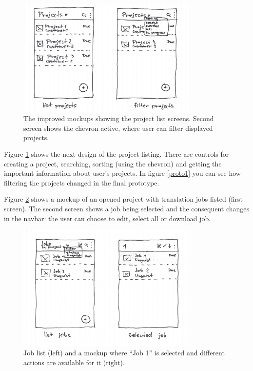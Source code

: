 \begin{figure}[H]
	\includegraphics[width=0.8\textwidth]{pics/projects1}
	\caption{The improved mockups showing the project list screens. Second screen shows the chevron active, where user can filter displayed projects.}
	\label{mock2}
\end{figure}


Figure \ref{mock2} shows the next design of the project listing. There are controls for creating a project, searching, sorting (using the chevron) and getting the important information about user's projects. In figure \ref{proto1} you can see how filtering the projects changed in the final prototype.




Figure \ref{mock3} shows a mockup of an opened project with translation jobs listed (first screen). The second screen shows a job being selected and the consequent changes in the navbar: the user can choose to edit, select all or download job.

\begin{figure}[H]
	\includegraphics[width=0.8\textwidth]{pics/jobs1}
	\caption{Job list (left) and a mockup where ``Job 1'' is selected and different actions are available for it (right).}
	\label{mock3}
\end{figure}


